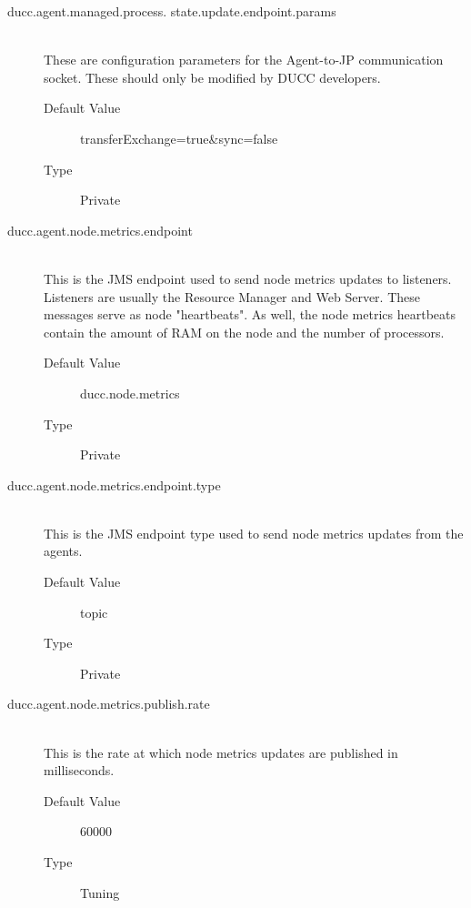 \begin{description}
        \item[ducc.agent.managed.process. state.update.endpoint.params] \hfill \\
          These are configuration parameters for the Agent-to-JP communication socket. These 
          should only be modified by DUCC developers. 
          \begin{description}
            \item[Default Value] transferExchange=true\&sync=false 
            \item[Type] Private
          \end{description} 
          
        \item[ducc.agent.node.metrics.endpoint] \hfill \\
          This is the JMS endpoint used to send node metrics updates to listeners. Listeners 
          are usually the Resource Manager and Web Server. These messages serve as node 
          "heartbeats". As well, the node metrics heartbeats contain the amount of RAM on the node 
          and the number of processors. 
          \begin{description}
            \item[Default Value] ducc.node.metrics 
            \item[Type] Private 
          \end{description}
          
        \item[ducc.agent.node.metrics.endpoint.type] \hfill \\
          This is the JMS endpoint type used to send node metrics updates from the agents. 
          \begin{description}
            \item[Default Value] topic 
            \item[Type] Private 
          \end{description}
         
        \item[ducc.agent.node.metrics.publish.rate] \hfill \\
          This is the rate at which node metrics updates are published in milliseconds. 
          \begin{description}
            \item[Default Value] 60000 
            \item[Type] Tuning 
          \end{description}
          

\end{description}
